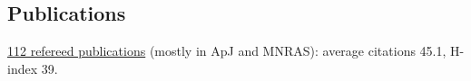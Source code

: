 \subsection*{Publications}

\href{https://tinyurl.com/j592dof}{112 refereed publications} (mostly in ApJ and MNRAS): average citations 45.1, H-index 39.

